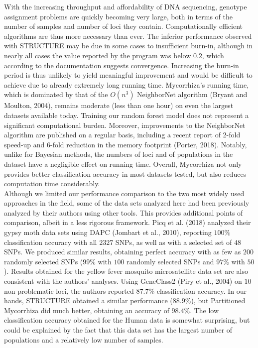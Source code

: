 \documentclass{bioinfo}
\begin{document}
With the increasing throughput and affordability of DNA sequencing, genotype assignment problems are quickly becoming very large, both in terms of the number of samples and number of loci they contain. Computationally efficient algorithms are thus more necessary than ever. The inferior performance observed with STRUCTURE may be due in some cases to insufficient burn-in, although in nearly all cases the value reported by the program was below $0.2$, which according to the documentation suggests convergence. Increasing the burn-in period is thus unlikely to yield meaningful improvement and would be difficult to achieve due to already extremely long running time. Mycorrhiza’s running time, which is dominated by that of the $O(n^{3})$ NeighborNet algorithm (Bryant and Moulton, 2004), remains moderate (less than one hour) on even the largest datasets available today. Training our random forest model does not represent a significant computational burden. Moreover, improvements to the NeighborNet algorithm are published on a regular basis, including a recent report of 2-fold speed-up and 6-fold reduction in the memory footprint (Porter, 2018). Notably, unlike for Bayesian methods, the numbers of loci and of populations in the dataset have a negligible effect on running time. Overall, Mycorrhiza not only provides better classification accuracy in most datasets tested, but also reduces computation time considerably.\\
Although we limited our performance comparison to the two most widely used approaches in the field, some of the data sets analyzed here had been previously analyzed by their authors using other tools. This provides additional points of comparison, albeit in a less rigorous framework. Picq et al. (2018) analyzed their gypsy moth data sets using DAPC (Jombart et al., 2010), reporting $100\%$ classification accuracy with all $2327$ SNPs, as well as with a selected set of $48$ SNPs. We produced similar results, obtaining perfect accuracy with as few as $200$ randomly selected SNPs ($99\%$ with $100$ randomly selected SNPs and $97\%$ with $50$). Results obtained for the yellow fever mosquito microsatellite data set are also consistent with the authors’ analyses. Using GeneClass2 (Piry et al., 2004) on $10$ non-problematic loci, the authors reported $87.7\%$ classification accuracy. In our hands, STRUCTURE obtained a similar performance ($88.9\%$), but Partitioned Mycorrhiza did much better, obtaining an accuracy of $98.4\%$. The low classification accuracy obtained for the Human data is somewhat surprising, but could be explained by the fact that this data set has the largest number of populations and a relatively low number of samples.\\
\end{document}
